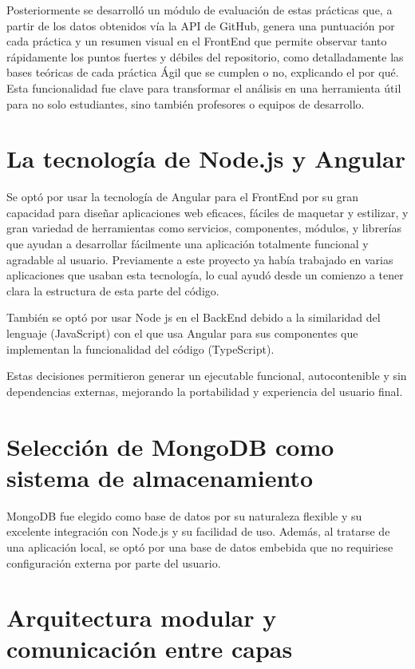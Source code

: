 Posteriormente se desarrolló un módulo de evaluación de estas prácticas que, a partir de los datos obtenidos vía la API de GitHub, genera una puntuación por cada práctica y un resumen visual en el FrontEnd que permite observar tanto rápidamente los puntos fuertes y débiles del repositorio, como detalladamente las bases teóricas de cada práctica Ágil que se cumplen o no, explicando el por qué. Esta funcionalidad fue clave para transformar el análisis en una herramienta útil para no solo estudiantes, sino también profesores o equipos de desarrollo.

\section{La tecnología de Node.js y Angular} Se optó por usar la tecnología de Angular para el FrontEnd por su gran capacidad para diseñar aplicaciones web eficaces, fáciles de maquetar y estilizar, y gran variedad de herramientas como servicios, componentes, módulos, y librerías que ayudan a desarrollar fácilmente una aplicación totalmente funcional y agradable al usuario. Previamente a este proyecto ya había trabajado en varias aplicaciones que usaban esta tecnología, lo cual ayudó desde un comienzo a tener clara la estructura de esta parte del código.

También se optó por usar Node js en el BackEnd debido a la similaridad del lenguaje (JavaScript) con el que usa Angular para sus componentes que implementan la funcionalidad del código (TypeScript).

Estas decisiones permitieron generar un ejecutable funcional, autocontenible y sin dependencias externas, mejorando la portabilidad y experiencia del usuario final.

\section{Selección de MongoDB como sistema de almacenamiento}

MongoDB fue elegido como base de datos por su naturaleza flexible y su excelente integración con Node.js y su facilidad de uso. Además, al tratarse de una aplicación local, se optó por una base de datos embebida que no requiriese configuración externa por parte del usuario.

\section{Arquitectura modular y comunicación entre capas}

